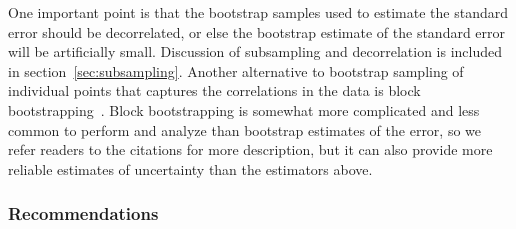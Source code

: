 One important point is that the bootstrap samples used to estimate the standard error should be decorrelated, or else the bootstrap estimate of the standard error will be artificially small. Discussion of subsampling and decorrelation is included in section~\ref{sec:subsampling}. Another alternative to bootstrap sampling of individual points that captures the correlations in the data is block bootstrapping~\cite{politis2004automatic, patton2009correction, kunsch1989jackknife}. Block bootstrapping is somewhat more complicated and less common to perform and analyze than bootstrap estimates of the error, so we refer readers to the citations for more description, but it can also provide more reliable estimates of uncertainty than the estimators above.


\subsubsection{Recommendations}
